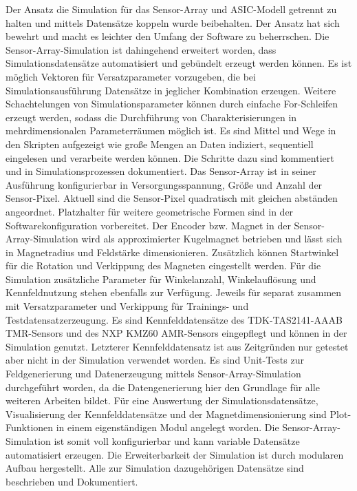 \newline
Der Ansatz die Simulation für das Sensor-Array und ASIC-Modell getrennt zu halten und mittels Datensätze koppeln wurde beibehalten. Der Ansatz hat sich bewehrt und macht es leichter den Umfang der Software zu beherrschen. Die Sensor-Array-Simulation ist dahingehend erweitert worden, dass Simulationsdatensätze automatisiert und gebündelt erzeugt werden können. Es ist möglich Vektoren für Versatzparameter vorzugeben, die bei Simulationsausführung Datensätze in jeglicher Kombination erzeugen. Weitere Schachtelungen von Simulationsparameter können durch einfache For-Schleifen erzeugt werden, sodass die Durchführung von Charakterisierungen in mehrdimensionalen Parameterräumen möglich ist. Es sind Mittel und Wege in den Skripten aufgezeigt wie große Mengen an Daten indiziert, sequentiell eingelesen und verarbeite werden können. Die Schritte dazu sind kommentiert und in Simulationsprozessen dokumentiert. Das Sensor-Array ist in seiner Ausführung konfigurierbar in Versorgungsspannung, Größe und Anzahl der Sensor-Pixel. Aktuell sind die Sensor-Pixel quadratisch mit gleichen abständen angeordnet. Platzhalter für weitere geometrische Formen sind in der Softwarekonfiguration vorbereitet. Der Encoder bzw. Magnet in der Sensor-Array-Simulation wird als approximierter Kugelmagnet betrieben und lässt sich in Magnetradius und Feldstärke dimensionieren. Zusätzlich können Startwinkel für die Rotation und Verkippung des Magneten eingestellt werden. Für die Simulation zusätzliche Parameter für Winkelanzahl, Winkelauflösung und Kennfeldnutzung stehen ebenfalls zur Verfügung. Jeweils für separat zusammen mit Versatzparameter und Verkippung für Trainings- und Testdatensatzerzeugung. Es sind Kennfelddatensätze des TDK-TAS2141-AAAB TMR-Sensors und des NXP KMZ60 AMR-Sensors eingepflegt und können in der Simulation genutzt. Letzterer Kennfelddatensatz ist aus Zeitgründen nur getestet aber nicht in der Simulation verwendet worden. Es sind Unit-Tests zur Feldgenerierung und Datenerzeugung mittels Sensor-Array-Simulation durchgeführt worden, da die Datengenerierung hier den Grundlage für alle weiteren Arbeiten bildet. Für eine Auswertung der Simulationsdatensätze, Visualisierung der Kennfelddatensätze und der Magnetdimensionierung sind Plot-Funktionen in einem eigenständigen Modul angelegt worden. Die Sensor-Array-Simulation ist somit voll konfigurierbar und kann variable Datensätze automatisiert erzeugen. Die Erweiterbarkeit der Simulation ist durch modularen Aufbau hergestellt. Alle zur Simulation dazugehörigen Datensätze sind beschrieben und Dokumentiert.
